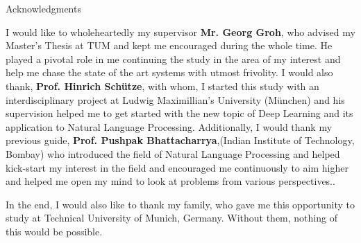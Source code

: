 \thispagestyle{empty}

\vspace*{2cm}

\begin{center}
{ Acknowledgments}
\end{center}

\vspace{1cm}

I would like to wholeheartedly my supervisor \textbf{Mr. Georg Groh}, who advised my Master's Thesis at TUM and kept me encouraged during the whole time. He played a pivotal role in me continuing the study in the area of my interest and help me chase the state of the art systems with utmost frivolity. I would also thank, \textbf{Prof. Hinrich Schütze}, with whom, I started this study with an interdisciplinary project at Ludwig Maximillian's University (München) and his supervision helped me to get started with the new topic of Deep Learning and its application to Natural Language Processing. Additionally, I would thank my previous guide, \textbf{Prof. Pushpak Bhattacharrya},(Indian Institute of Technology, Bombay) who introduced the field of Natural Language Processing and helped kick-start my interest in the field and encouraged me continuously to aim higher and helped me open my mind to look at problems from various perspectives..  

In the end, I would also like to thank my family, who gave me this opportunity to study at Technical University of Munich, Germany. Without them, nothing of this would be possible. 
\cleardoublepage{}
